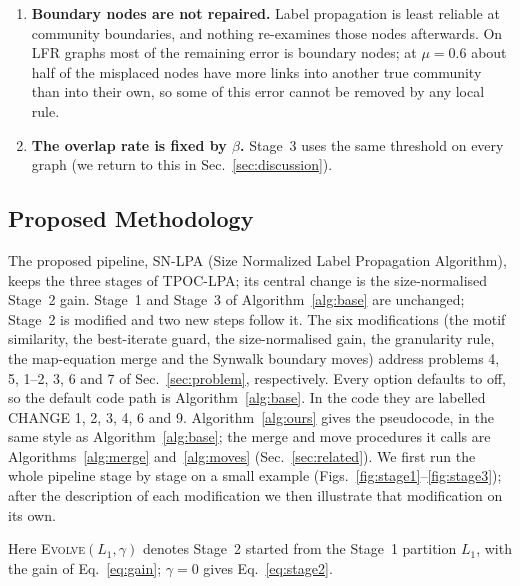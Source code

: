 \documentclass[conference]{IEEEtran}
\begin{document}
\begin{enumerate}
\item \textbf{Boundary nodes are not repaired.} Label propagation is least reliable at community boundaries, and nothing re-examines those nodes afterwards. On LFR graphs most of the remaining error is boundary nodes; at $\mu=0.6$ about half of the misplaced nodes have more links into another true community than into their own, so some of this error cannot be removed by any local rule.
\item \textbf{The overlap rate is fixed by $\beta$.} Stage~3 uses the same threshold on every graph (we return to this in Sec.~\ref{sec:discussion}).
\end{enumerate}

\subsection{Proposed Methodology}\label{sec:arch}
The proposed pipeline, SN-LPA (Size Normalized Label Propagation Algorithm), keeps the three stages of TPOC-LPA; its central change is the size-normalised Stage~2 gain. Stage~1 and Stage~3 of Algorithm~\ref{alg:base} are unchanged; Stage~2 is modified and two new steps follow it. The six modifications (the motif similarity, the best-iterate guard, the size-normalised gain, the granularity rule, the map-equation merge and the Synwalk boundary moves) address problems 4, 5, 1--2, 3, 6 and 7 of Sec.~\ref{sec:problem}, respectively. Every option defaults to off, so the default code path is Algorithm~\ref{alg:base}. In the code they are labelled CHANGE 1, 2, 3, 4, 6 and 9. Algorithm~\ref{alg:ours} gives the pseudocode, in the same style as Algorithm~\ref{alg:base}; the merge and move procedures it calls are Algorithms~\ref{alg:merge} and~\ref{alg:moves} (Sec.~\ref{sec:related}). We first run the whole pipeline stage by stage on a small example (Figs.~\ref{fig:stage1}--\ref{fig:stage3}); after the description of each modification we then illustrate that modification on its own.


Here \textsc{Evolve}$(L_1,\gamma)$ denotes Stage~2 started from the Stage~1 partition $L_1$, with the gain of Eq.~\eqref{eq:gain}; $\gamma=0$ gives Eq.~\eqref{eq:stage2}.
\end{document}
